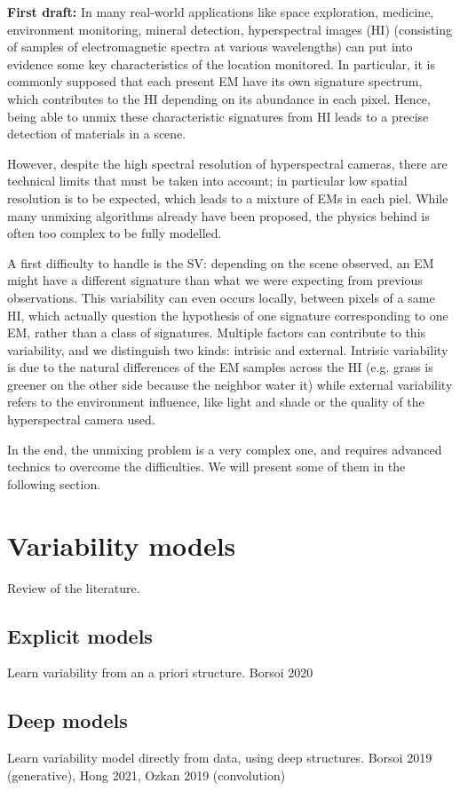 \documentclass[conference]{IEEEtran}
\begin{document}
\textbf{First draft:} In many real-world applications like space exploration, medicine, environment monitoring, mineral detection, hyperspectral images (HI) (consisting of samples of electromagnetic spectra at various wavelengths) can put into evidence some key characteristics of the location monitored. In particular, it is commonly supposed that each present EM have its own signature spectrum, which contributes to the HI depending on its abundance in each pixel. Hence, being able to unmix these characteristic signatures from HI leads to a precise detection of materials in a scene.

However, despite the high spectral resolution of hyperspectral cameras, there are technical limits that must be taken into account; in particular low spatial resolution is to be expected, which leads to a mixture of EMs in each piel. While many unmixing algorithms already have been proposed, the physics behind is often too complex to be fully modelled.

A first difficulty to handle is the SV: depending on the scene observed, an EM might have a different signature than what we were expecting from previous observations. This variability can even occurs locally, between pixels of a same HI, which actually question the hypothesis of one signature corresponding to one EM, rather than a class of signatures. Multiple factors can contribute to this variability, and we distinguish two kinds: intrisic and external. Intrisic variability is due to the natural differences of the EM samples across the HI (e.g. grass is greener on the other side because the neighbor water it) while external variability refers to the environment influence, like light and shade or the quality of the hyperspectral camera used.

In the end, the unmixing problem is a very complex one, and requires advanced technics to overcome the difficulties. We will present some of them in the following section.

\section{Variability models}
Review of the literature.

\subsection{Explicit models}
Learn variability from an a priori structure. Borsoi 2020

\subsection{Deep models}
Learn variability model directly from data, using deep structures. Borsoi 2019 (generative), Hong 2021, Ozkan 2019 (convolution)
\end{document}
